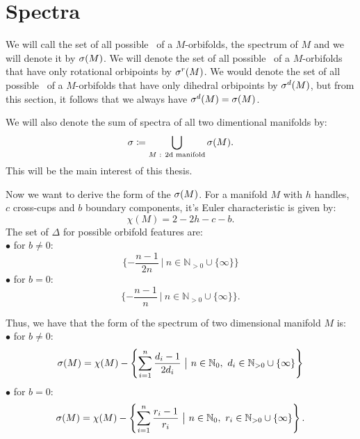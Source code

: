 

\section{Spectra}\label{spectra}
We will call the set of all possible \Eoc\ of a $M$-orbifolds, the spectrum of $M$ and 
we will denote it by ${{\sigma}(M)}$. We will denote the set of all possible \Eoc\ of a $M$-orbifolds 
that have only rotational orbipoints by ${\sigma}^r(M)$. 
We would denote the set of all possible \Eoc\ of a $M$-orbifolds 
that have only dihedral orbipoints by ${\sigma}^d(M)$, but from this section, it follows that 
we always have ${\sigma}^d(M) = {{\sigma}(M)}$. 

We will also denote the sum of spectra of all two dimentional manifolds by:
\begin{equation}
{\sigma} \coloneqq \bigcup_{M\textrm{ : 2d manifold}} {{\sigma}(M)}.
\end{equation}
This will be the main interest of this thesis. 

Now we want to derive the form of the ${{\sigma}(M)}$.
For a manifold $M$ with $h$ handles, $c$ cross-cups and $b$ boundary components, it's 
Euler characteristic is given by:
\begin{equation}
\chi(M) = 2-2h-c-b.
\end{equation}
The set of $\Delta$ for possible orbifold features are:\\
$\bullet$ for $b\neq 0$:
\begin{equation}
\{-\frac{n-1}{2n}\ \big|\ n\in\mathbb{N}_{>0}\cup \{\infty\}\}
\end{equation}
$\bullet$ for $b = 0$:
\begin{equation}
\{-\frac{n-1}{n}\ \big|\ n\in\mathbb{N}_{>0}\cup \{\infty\}\}.
\end{equation} 

Thus, we have that the form of the spectrum of two dimensional manifold $M$ is:\\
$\bullet$ for $b\neq 0$: 
\begin{equation}
\spe(M) = \chi(M) - \left\{\sum\limits_{i=1}^n\frac{d_i-1}{2d_i}\ 
\big|\ n\in\mathbb{N}_0,\ d_i\in\mathbb{N}_{>0}\cup \{\infty\}\right\}
\end{equation}
$\bullet$ for $b = 0$:
\begin{equation}
\spe(M) = \chi(M) - \left\{\sum\limits_{i=1}^n \frac{r_i-1}{r_i}\ \big|\ n\in\mathbb{N}_0,\ 
r_i\in\mathbb{N}_{>0}\cup \{\infty\}\right\}.
\end{equation} 
\label{two dim manifold spectrum}


